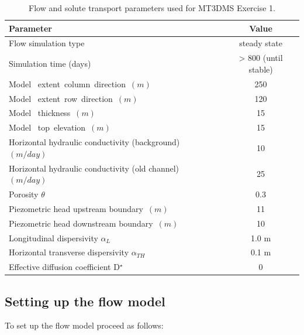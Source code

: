 \begin{table}[hb]
\caption{Flow and solute transport parameters used for MT3DMS Exercise 1.}
\begin{center}
\begin{tabular}{lc} 
\toprule
Parameter                                            &         Value \\
\midrule
Flow simulation type                                 &        steady state \\
Simulation time (days)                               &  > 800 (until stable) \\
Model \  extent\ column\ direction\ $ (m)$           &  250            \\
Model \  extent\ row\ direction\ $ (m)  $            &  120            \\
Model \  thickness\ $(m)$                            &   15            \\
Model \ top\ elevation\ $(m)$                        &   15            \\
Horizontal hydraulic conductivity (background)\ $(m/day)$         &   10     \\
Horizontal hydraulic conductivity (old channel)\ $(m/day)$         &   25     \\  
Porosity $\theta$                                   &           0.3  \\
Piezometric head upstream boundary\ $(m) $           &  11        \\ 
Piezometric head downstream boundary\ $(m) $         &  10            \\ 
Longitudinal dispersivity $\alpha_L$                &           1.0 m \\
Horizontal transverse dispersivity $\alpha_{TH}$    &           0.1 m \\
Effective diffusion coefficient D$^{\star}$          &             0  \\
\bottomrule

\end{tabular}
\label{single_spec_table_1}
\end{center}
\end{table}

\subsection{Setting up the flow model}

To set up the flow model proceed as follows:


